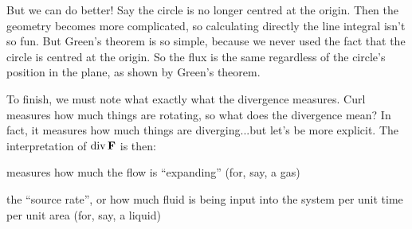 But we can do better! Say the circle is no longer centred at the origin. Then the geometry becomes more complicated, so calculating directly the line integral isn't so fun. But Green's theorem is so simple, because we never used the fact that the circle is centred at the origin. So the flux is the same regardless of the circle's position in the plane, as shown by Green's theorem.  
\eex

To finish, we must note what exactly what the divergence measures. Curl measures how much things are rotating, so what does the divergence mean? In fact, it measures how much things are diverging...but let's be more explicit. The interpretation of $\mathrm{div}\, \boldsymbol{\mathbf{F}}$ is then:
\ben
\item measures how much the flow is ``expanding'' (for, say, a gas)
\item the ``source rate'', or how much fluid is being input into the system per unit time per unit area (for, say, a liquid)
\een